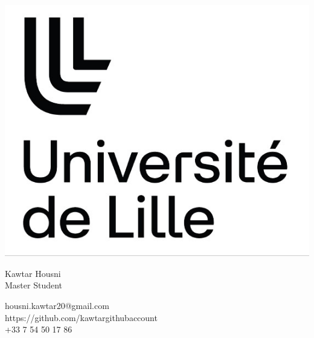 \documentclass{article}
\begin{document}
\centering \includegraphics[width=.25\linewidth]{ulille.jpg}\\
[5pt]
\parbox{2in}{\Large \centering Kawtar Housni  \\[1pt]
\normalsize  Master Student}

\vfill
\raggedright
\begin{multicols}{2}
housni.kawtar20@gmail.com \\
https://github.com/kawtargithubaccount \\


\columnbreak
\raggedleft
+33 7 54 50 17 86%


\end{multicols}
\end{document}
